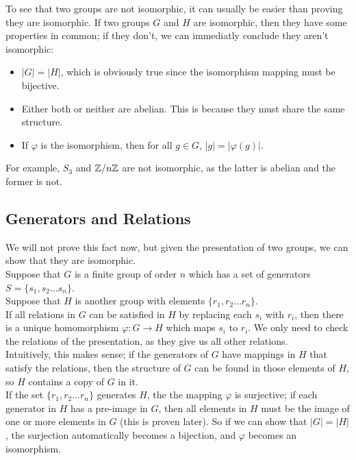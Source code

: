 \documentclass[12pt]{article}
\begin{document}
    To see that two groups are not isomorphic,
    it can usually be easier than proving they are isomorphic.
    If two groups $G$ and $H$ are isomorphic,
    then they have some properties in common;
    if they don't, we can immediatly conclude they aren't isomorphic:
    \begin{itemize}[label=$\diamond$]
        \item 
            $|G| = |H|$,
            which is obviously true since the isomorphism mapping
            must be bijective.
        \item 
            Either both or neither are abelian.
            This is because they must share the same structure.
        \item 
            If $\varphi$ is the isomorphism,
            then for all $g \in G$,
            $|g| = |\varphi(g)|$.
    \end{itemize} 
    For example, $S_3$ and $\mathbb{Z}/n\mathbb{Z}$ are not isomorphic,
    as the latter is abelian and the former is not. \\


    \subsection*{Generators and Relations}

    We will not prove this fact now,
    but given the presentation of two groups,
    we can show that they are isomorphic. \\
    Suppose that $G$ is a finite group of order $n$
    which has a set of generators $S = \{ s_1, s_2 \dots s_n \}$. \\
    Suppose that $H$ is another group
    with elements $\{ r_1, r_2 \dots r_n\}$. \\
    If all relations in $G$ can be satisfied in $H$
    by replacing each $s_i$ with $r_i$,
    then there is a unique homomorphism $\varphi: G \to H$
    which maps $s_i$ to $r_i$.
    We only need to check the relations of the presentation,
    as they give us all other relations. \\
    Intuitively, this makes sense;
    if the generators of $G$ have mappings in $H$
    that satisfy the relations,
    then the structure of $G$ can be found
    in those elements of $H$,
    so $H$ contains a copy of $G$ in it. \\
    If the set $\{ r_1, r_2 \dots r_n\}$ generates $H$,
    the the mapping $\varphi$ is surjective;
    if each generator in $H$ has a pre-image in $G$,
    then all elements in $H$ must be the image of one or more
    elements in $G$ (this is proven later). 
    So if we can show that $|G| = |H|$,
    the surjection automatically becomes a bijection,
    and $\varphi$ becomes an isomorphism. \\
\end{document}
